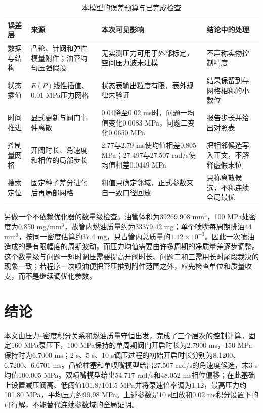 \documentclass[UTF8,11pt,a4paper]{ctexart}
\begin{document}
\begin{table}[H]
\centering
\caption{本模型的误差预算与已完成检查}
\label{tab:error-budget-a}
\small
\begin{tabularx}{\textwidth}{p{2.4cm}p{3.8cm}p{4.7cm}X}
\toprule
误差层 & 来源 & 本次可见影响 & 结论中的处理\\
\midrule
数据与结构 & 凸轮、针阀和弹性模量附件；油管均匀压强假设 & 无实测压力可用于外部标定，空间压力波未建模 & 不声称实物控制精度\\
状态插值 & $E(P)$线性插值、0.01 MPa压力网格 & 状态表输出粒度有限，表外规律未验证 & 结果保留到与网格相称的小数位\\
时间推进 & 显式更新与阀门事件离散 & 0.04降至0.02 ms时，问题一均值变化0.0083 MPa，问题二变化0.0650 MPa & 报告步长并给出对照表\\
控制量网格 & 开阀时长、角速度和相位的局部步长 & 2.77与2.79 ms使均值相差0.805 MPa；27.497与27.507 rad/s使均值相差0.0449 MPa & 把相邻候选写入正文，不解释虚假末位\\
搜索定位 & 固定种子差分进化后再局部网格 & 粗值只确定邻域，正式参数来自一致口径回放 & 只称离散候选，不称连续全局最优\\
\bottomrule
\end{tabularx}
\end{table}

另做一个不依赖优化器的数量级检查。油管体积为39269.908 mm$^3$，100 MPa处密度为0.850 mg/mm$^3$，故管内燃油质量约为33379.42 mg；单个喷嘴每周期排油44 mm$^3$，按同一密度估算约37.4 mg，只占管内总质量的$1.12\times10^{-3}$。因此一次喷油造成的是有限幅度的周期波动，而压力均值需要由许多周期的净质量差逐步调整。这个数量级与问题一短时调压需要提高开阀时长、问题二和三需用长时尾段裁决的现象一致；若程序一次喷油便把管压推到附件范围之外，应先检查单位和质量收支，而不是继续调优化参数。

\section{结论}

本文由压力--密度积分关系和燃油质量守恒出发，完成了三个层次的控制计算。固定160 MPa泵压下，100 MPa保持的单周期阀门开启时长为2.7900 ms，150 MPa保持时为6.7000 ms；2 s、5 s、10 s调压过程的初始开启时长分别为8.1200、6.7200、6.6701 ms。凸轮柱塞和单喷嘴模型给出27.507 rad/s的角速度候选，末3 s均值100.005 MPa。双喷嘴模型给出54.717 rad/s和48.052 ms相位偏移；在此基础上设置减压阀高、低阈值101.8/101.5 MPa并将泵速倍率调为1.12，最高压力约101.80 MPa，平均压力约99.98 MPa。上述参数是10 s回放和0.02 ms积分设置下的可行解，不能替代连续参数域的全局证明。
\end{document}
